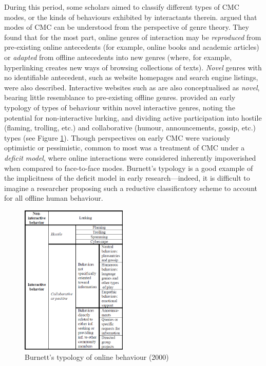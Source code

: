 During this period, some scholars aimed to classify different types of \gls{CMC} modes, or the kinds of behaviours exhibited by interactants therein. \textcite{crowston_reproduced_2000} argued that modes of \gls{CMC} can be understood from the perspective of genre theory. They found that for the most part, online genres of interaction may be \emph{reproduced} from pre-existing online antecedents (for example, online books and academic articles) or \emph{adapted} from offline antecedents into new genres (where, for example, hyperlinking creates new ways of browsing collections of texts). \emph{Novel} genres with no identifiable antecedent, such as website homepages and search engine listings, were also described. Interactive websites such as  are also conceptualised as \emph{novel}, bearing little resemblance to pre-existing offline genres. \textcite{burnett_information_2000} provided an early typology of types of behaviour within novel interactive genres, noting the potential for non\hyp{}interactive lurking, and dividing active participation into hostile (flaming, trolling, etc.) and collaborative (humour, announcements, gossip, etc.) types (see Figure \ref{fig:burnett}). Though perspectives on early \gls{CMC} were variously optimistic or pessimistic, common to most was a treatment of \gls{CMC} under a \emph{deficit model}, where online interactions were considered inherently impoverished when compared to face\hyp{}to\hyp{}face modes. Burnett's typology is a good example of the implicitness of the deficit model in early research---indeed, it is difficult to imagine a researcher proposing such a reductive classificatory scheme to account for all offline human behaviour.

\begin{figure}[htb]
\centering
\includegraphics[width=0.45\textwidth]{../images/burnett.png}
\caption[Burnett's typology of online behaviour]{Burnett's typology of online behaviour (2000)}
\label{fig:burnett}
\end{figure}

